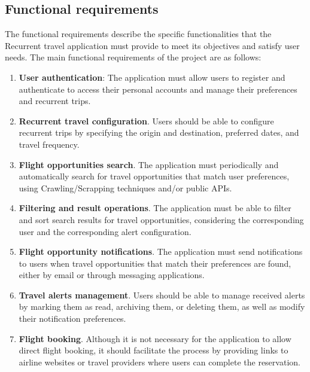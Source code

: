\documentclass[../memory.tex]{subfiles}
\begin{document}
\subsection{Functional requirements}
The functional requirements describe the specific functionalities that the
Recurrent travel application must provide to meet its objectives and satisfy
user needs. The main functional requirements of the project are as follows:
\begin{enumerate}
	\item \textbf{User authentication}: The application must allow users to register and
	      authenticate to access their personal accounts and manage their
	      preferences and recurrent trips.
	\item \textbf{Recurrent travel configuration}. Users should be able to configure
	      recurrent trips by specifying the origin and destination, preferred dates,
	      and travel frequency.
	\item \textbf{Flight opportunities search}. The application must periodically
	      and automatically search for travel opportunities that match user
	      preferences, using Crawling/Scrapping techniques and/or public APIs.
	\item \textbf{Filtering and result operations}. The application must be able to
	      filter and sort search results for travel opportunities, considering the
	      corresponding user and the corresponding alert configuration.
	\item \textbf{Flight opportunity notifications}. The application must send
	      notifications to users when travel opportunities that match their
	      preferences are found, either by email or through messaging applications.
	\item \textbf{Travel alerts management}. Users should be able to manage received alerts by
	      marking them as read, archiving them, or deleting them, as well as modify
	      their notification preferences.
	\item \textbf{Flight booking}. Although it is not necessary for the application to
	      allow direct flight booking, it should facilitate the process by providing
	      links to airline websites or travel providers where users can complete the
	      reservation.
\end{enumerate}
\end{document}
